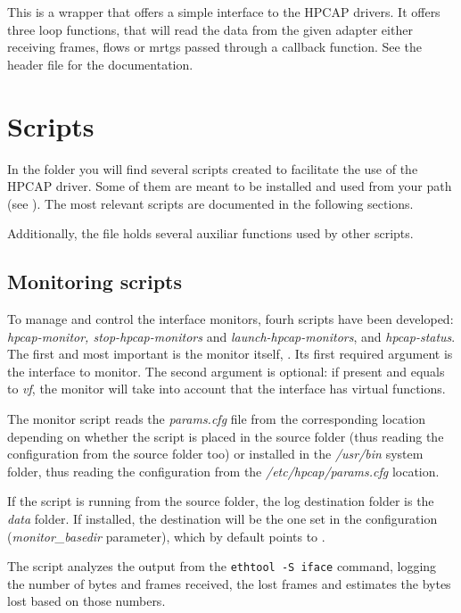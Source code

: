 \documentclass[oneside]{hpman}
\begin{document}
This is a wrapper that offers a simple interface to the HPCAP drivers. It offers three loop functions, that will read the data from the given adapter either receiving frames, flows or mrtgs passed through a callback function. See the  header file for the documentation.

\section{Scripts}
\label{sec:scripts}

In the  folder you will find several scripts created to facilitate the use of the HPCAP driver. Some of them are meant to be installed and used from your path (see ). The most relevant scripts are documented in the following sections.

Additionally, the  file holds several auxiliar functions used by other scripts.

\subsection{Monitoring scripts}
\label{sec:scripts:monitoring}

To manage and control the interface monitors, fourh scripts have been developed: \textit{hpcap-monitor, stop-hpcap-monitors} and \textit{launch-hpcap-monitors}, and \textit{hpcap-status}. The first and most important is the monitor itself, . Its first required argument is the interface to monitor. The second argument is optional: if present and equals to \textit{vf}, the monitor will take into account that the interface has virtual functions.

The monitor script reads the \textit{params.cfg} file from the corresponding location depending on whether the script is placed in the source folder (thus reading the configuration from the source folder too) or installed in the \textit{/usr/bin} system folder, thus reading the configuration from the \textit{/etc/hpcap/params.cfg} location.

If the script is running from the source folder, the log destination folder is the \textit{data} folder. If installed, the destination will be the one set in the configuration (\textit{monitor\_basedir} parameter), which by default points to .

The script analyzes the output from the \texttt{ethtool -S iface} command, logging the number of bytes and frames received, the lost frames and estimates the bytes lost based on those numbers.
\end{document}
